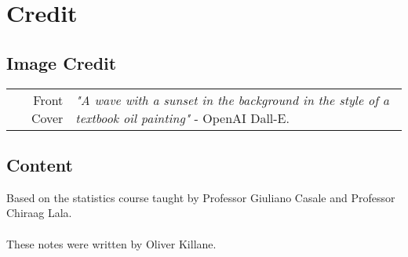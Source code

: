 \chapter{Credit}
\section*{Image Credit}
\begin{center}
	\begin{tabular}{r p{}}
        Front Cover & \textit{"A wave with a sunset in the background in the style of a textbook oil painting"} - OpenAI Dall-E. \\
	\end{tabular}
\end{center}

\section*{Content}
Based on the statistics course taught by Professor Giuliano Casale and Professor Chiraag Lala.
\\
\\ These notes were written by Oliver Killane.
